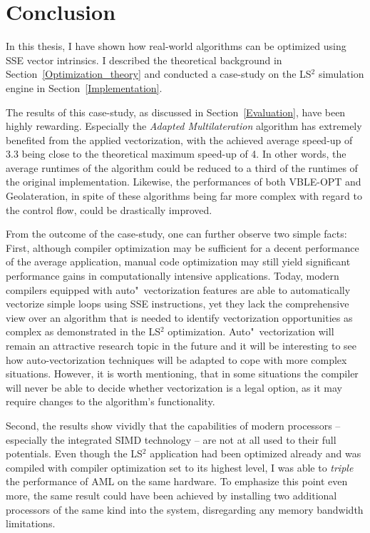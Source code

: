 \section{Conclusion}
\label{Conclusion}
In this thesis, I have shown how real-world algorithms can be optimized using SSE vector intrinsics. I described the theoretical background in Section~\ref{Optimization_theory} and conducted a case-study on the LS$^{2}$ simulation engine in Section~\ref{Implementation}.

The results of this case-study, as discussed in Section~\ref{Evaluation}, have been highly rewarding. Especially the \emph{Adapted Multilateration} algorithm has extremely benefited from the applied vectorization, with the achieved average speed-up of 3.3 being close to the theoretical maximum speed-up of 4. In other words, the average runtimes of the algorithm could be reduced to a third of the runtimes of the original implementation. Likewise, the performances of both VBLE-OPT and Geolateration, in spite of these algorithms being far more complex with regard to the control flow, could be drastically improved.

From the outcome of the case-study, one can further observe two simple facts: First, although compiler optimization may be sufficient for a decent performance of the average application, manual code optimization may still yield significant performance gains in computationally intensive applications. Today, modern compilers equipped with auto"~vectorization features are able to automatically vectorize simple loops using SSE instructions, yet they lack the comprehensive view over an algorithm that is needed to identify vectorization opportunities as complex as demonstrated in the LS$^{2}$ optimization. Auto"~vectorization will remain an attractive research topic in the future and it will be interesting to see how auto-vectorization techniques will be adapted to cope with more complex situations. However, it is worth mentioning, that in some situations the compiler will never be able to decide whether vectorization is a legal option, as it may require changes to the algorithm's functionality.

Second, the results show vividly that the capabilities of modern processors -- especially the integrated SIMD technology -- are not at all used to their full potentials. Even though the LS$^{2}$ application had been optimized already and was compiled with compiler optimization set to its highest level, I was able to \emph{triple} the performance of AML on the same hardware. To emphasize this point even more, the same result could have been achieved by installing two additional processors of the same kind into the system, disregarding any memory bandwidth limitations. 

